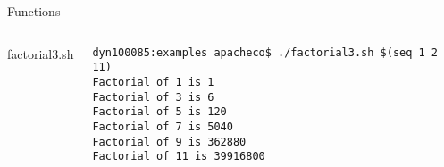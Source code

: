 \documentclass[10pt,t]{beamer}
\begin{document}
\begin{frame}{Functions}
{\begin{columns}
\begin{exampleblock}{factorial3.sh}
      \end{exampleblock}
        \begin{lstlisting}[style=LINUX,basicstyle=\fontsize{4}{4.5}\selectfont\ttfamily]
dyn100085:examples apacheco$ ./factorial3.sh $(seq 1 2 11)
Factorial of 1 is 1
Factorial of 3 is 6
Factorial of 5 is 120
Factorial of 7 is 5040
Factorial of 9 is 362880
Factorial of 11 is 39916800
        \end{lstlisting}
    \end{columns}
  }
\end{frame}

\end{document}
